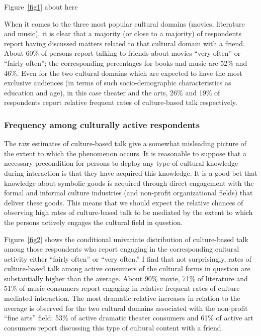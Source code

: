 \documentclass[11pt]{article}
\begin{document}
\begin{center}
	Figure~\ref{fig1} about here
\end{center}
 
When it comes to the three most popular cultural domains  (movies, literature and music), it is clear that a majority (or close to a majority) of respondents report having discussed matters related to that cultural domain with a friend.  About 60\% of persons report talking to friends about movies ``very often'' or ``fairly often''; the corresponding percentages for books and music are 52\% and 46\%. Even for the two cultural domains which are expected to have the most exclusive audiences (in terms of such socio-demographic characteristics as education and age), in this case theater and the arts, 26\% and 19\% of respondents report relative frequent rates of culture-based talk respectively. 
 
\subsubsection{Frequency among culturally active respondents}
The raw estimates of culture-based talk give a somewhat misleading picture of the extent to which the phenomenon occurs. It is reasonable to suppose that a necessary precondition for persons to deploy any type of cultural knowledge during interaction is that they have acquired this knowledge.  It is a good bet that knowledge about symbolic goods is acquired through direct engagement with the formal and informal culture industries (and non-profit organizational fields) that deliver these goods.  This means that we should expect the relative chances of observing high rates of culture-based talk to be mediated by the extent to which the persons actively engages the cultural field in question.
 
Figure~\ref{fig2} shows the conditional univariate distribution of culture-based talk among those respondents who report engaging in the corresponding cultural activity either ``fairly often'' or ``very often.''  I find that not surprisingly, rates of culture-based talk among active consumers of the cultural forms in question are substantially higher than the average.  About 90\% movie, 71\% of literature and 51\% of music consumers report engaging in relative frequent rates of culture mediated interaction.  The most dramatic relative increases in relation to the average is observed for the two cultural domains associated with the non-profit ``fine arts'' field:  53\% of active dramatic theater consumers and 61\% of active art consumers report discussing this type of cultural content with a friend.  
\end{document}

